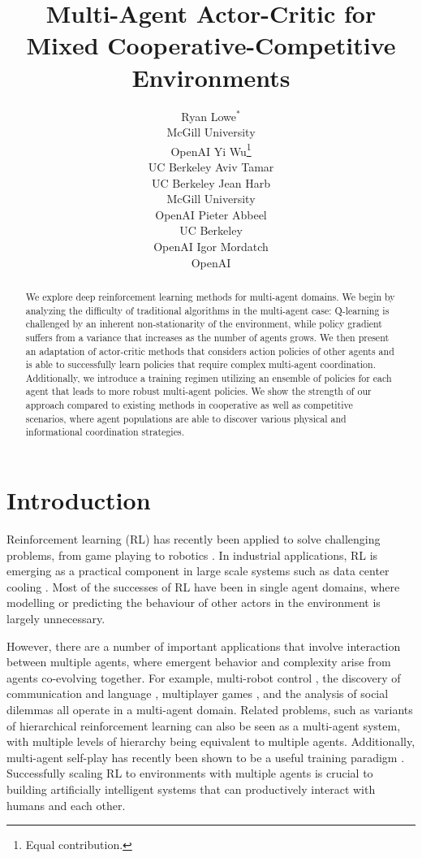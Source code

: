 \documentclass{article}
\title{Multi-Agent Actor-Critic for Mixed Cooperative-Competitive Environments}
\author{Ryan Lowe$^*$\\ McGill University\\ OpenAI \And \hspace{-4mm}Yi Wu\thanks{Equal contribution.}\\ \hspace{-4mm}UC Berkeley \And Aviv Tamar\\ UC Berkeley \AND Jean Harb\\McGill University\\ OpenAI \And Pieter Abbeel\\UC Berkeley\\ OpenAI \And Igor Mordatch\\ OpenAI
}
\begin{document}
\maketitle

\begin{abstract}
We explore deep reinforcement learning methods for multi-agent domains. We begin by analyzing the difficulty of traditional algorithms in the multi-agent case: Q-learning is challenged by an inherent non-stationarity of the environment, while policy gradient suffers from a variance that increases as the number of agents grows. 
We then present an adaptation of actor-critic methods that considers action policies of other agents and is able to successfully learn policies that require complex multi-agent coordination. Additionally, we introduce a training regimen utilizing an ensemble of policies for each agent that leads to more robust multi-agent policies. We show the strength of our approach compared to existing methods in cooperative as well as competitive scenarios, where agent populations are able to discover various physical and informational coordination strategies.





\end{abstract}

\section{Introduction}
Reinforcement learning (RL) has recently been applied to solve challenging problems, from game playing \cite{mnih2015human,alphago} to robotics \cite{levine2015end}. In industrial applications, RL is emerging as a practical component in large scale systems such as data center cooling \cite{googleblog}. 
Most of the successes of RL have been in single agent domains, where modelling or predicting the behaviour of other actors in the environment is largely unnecessary.


However, there are a number of important applications that involve interaction between multiple agents, where emergent behavior and complexity arise from agents co-evolving together. For example, multi-robot control \cite{matignon12coordinated}, the discovery of communication and language \cite{sukhbaatar2016learning,foerster16b,mordatch2017emergence}, multiplayer games \cite{peng17starcraft}, and the analysis of social dilemmas \cite{multiagent_ssd} all operate in a multi-agent domain. Related problems, such as variants of hierarchical reinforcement learning \cite{dayan93feudal} can also be seen as a multi-agent system, with multiple levels of hierarchy being equivalent to multiple agents. Additionally, multi-agent self-play has recently been shown to be a useful training paradigm \cite{alphago, sukhbaatar2017intrinsic}. 
Successfully scaling RL to environments with multiple agents is crucial to building artificially intelligent systems that can productively interact with humans and each other.
\end{document}

